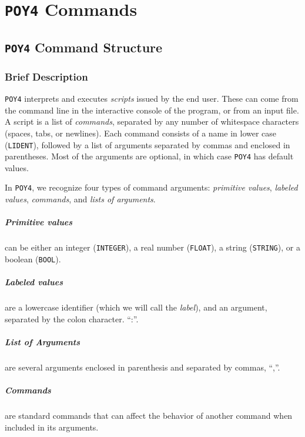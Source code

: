 \documentclass[11pt]{book}
\newcommand{\commandstyle}[1]{\texttt{#1}}
\newcommand{\poystring}{\commandstyle{STRING}\xspace}
\newcommand{\poyfloat}{\commandstyle{FLOAT}\xspace}
\newcommand{\poyint}{\commandstyle{INTEGER}\xspace}
\newcommand{\poybool}{\commandstyle{BOOL}\xspace}
\newcommand{\poylident}{\commandstyle{LIDENT}\xspace}
\newcommand{\poy}{\commandstyle{POY4}\xspace}
\begin{document}
\tableofcontents



\chapter{\poy Commands}

\section{\poy Command Structure}

\subsection{Brief Description} \label{commands}

\poy interprets and executes \emph{scripts} issued by the end user.  These can
come from the command line in the interactive console of the program, or from an
input file. A script is a list of \emph{commands}, separated by any number of
whitespace characters (spaces, tabs, or newlines). Each command consists of a
name  in lower case (\poylident), followed by a list of arguments separated 
by commas and enclosed in parentheses. Most of the arguments are optional, in
which case \poy has default values.

In \poy, we recognize four types of command arguments: \emph{primitive values},
\emph{labeled values}, \emph{commands}, and \emph{lists of arguments}.

\paragraph{Primitive values} can be either an integer (\poyint), a real number
(\poyfloat), a string (\poystring), or a boolean (\poybool).

\paragraph{Labeled values} are a lowercase identifier (which we will call the
\emph{label}), and an argument, separated by the colon character. ``:''.

\paragraph{List of Arguments} are several arguments enclosed in parenthesis and
separated by commas, ``,''.

\paragraph{Commands} are standard commands that can affect the behavior of
another command when included in its arguments.
\end{document}

